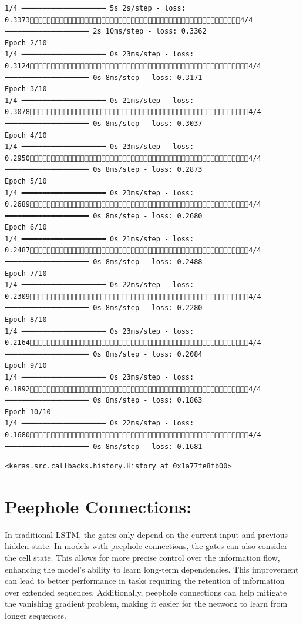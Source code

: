 \documentclass[
  letterpaper,
  DIV=11,
  numbers=noendperiod]{scrreprt}
\begin{document}
\begin{verbatim}
1/4 ━━━━━━━━━━━━━━━━━━━━ 5s 2s/step - loss: 0.33734/4 ━━━━━━━━━━━━━━━━━━━━ 2s 10ms/step - loss: 0.3362
Epoch 2/10
1/4 ━━━━━━━━━━━━━━━━━━━━ 0s 23ms/step - loss: 0.31244/4 ━━━━━━━━━━━━━━━━━━━━ 0s 8ms/step - loss: 0.3171 
Epoch 3/10
1/4 ━━━━━━━━━━━━━━━━━━━━ 0s 21ms/step - loss: 0.30784/4 ━━━━━━━━━━━━━━━━━━━━ 0s 8ms/step - loss: 0.3037 
Epoch 4/10
1/4 ━━━━━━━━━━━━━━━━━━━━ 0s 23ms/step - loss: 0.29504/4 ━━━━━━━━━━━━━━━━━━━━ 0s 8ms/step - loss: 0.2873 
Epoch 5/10
1/4 ━━━━━━━━━━━━━━━━━━━━ 0s 23ms/step - loss: 0.26894/4 ━━━━━━━━━━━━━━━━━━━━ 0s 8ms/step - loss: 0.2680 
Epoch 6/10
1/4 ━━━━━━━━━━━━━━━━━━━━ 0s 21ms/step - loss: 0.24874/4 ━━━━━━━━━━━━━━━━━━━━ 0s 8ms/step - loss: 0.2488 
Epoch 7/10
1/4 ━━━━━━━━━━━━━━━━━━━━ 0s 22ms/step - loss: 0.23094/4 ━━━━━━━━━━━━━━━━━━━━ 0s 8ms/step - loss: 0.2280 
Epoch 8/10
1/4 ━━━━━━━━━━━━━━━━━━━━ 0s 23ms/step - loss: 0.21644/4 ━━━━━━━━━━━━━━━━━━━━ 0s 8ms/step - loss: 0.2084 
Epoch 9/10
1/4 ━━━━━━━━━━━━━━━━━━━━ 0s 23ms/step - loss: 0.18924/4 ━━━━━━━━━━━━━━━━━━━━ 0s 8ms/step - loss: 0.1863 
Epoch 10/10
1/4 ━━━━━━━━━━━━━━━━━━━━ 0s 22ms/step - loss: 0.16804/4 ━━━━━━━━━━━━━━━━━━━━ 0s 8ms/step - loss: 0.1681 
\end{verbatim}

\begin{verbatim}
<keras.src.callbacks.history.History at 0x1a77fe8fb00>
\end{verbatim}

\section{Peephole Connections:}\label{peephole-connections}

In traditional LSTM, the gates only depend on the current input and
previous hidden state. In models with peephole connections, the gates
can also consider the cell state. This allows for more precise control
over the information flow, enhancing the model's ability to learn
long-term dependencies. This improvement can lead to better performance
in tasks requiring the retention of information over extended sequences.
Additionally, peephole connections can help mitigate the vanishing
gradient problem, making it easier for the network to learn from longer
sequences.
\end{document}

